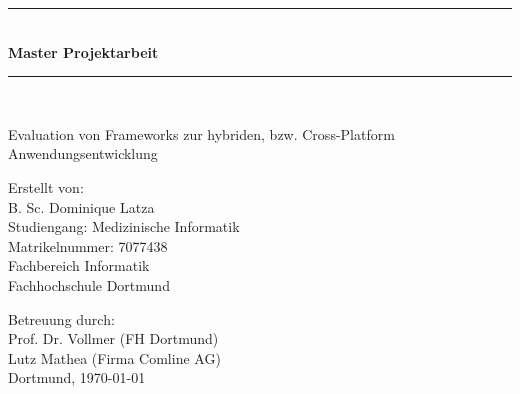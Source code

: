 \newcommand{\HRule}{\rule{\linewidth}					{0.5mm}}

\begin{titlepage}
	\begin{center}

\HRule \\[0.1cm]

\textbf{\large{
Master Projektarbeit
}}

\HRule \\[0.1cm]
\vspace{2.5cm}

\large{}
Evaluation von Frameworks zur hybriden, bzw. Cross-Platform Anwendungsentwicklung
\vspace{2.5cm}

\large{}
Erstellt von:\\
B. Sc. Dominique Latza\\
Studiengang: Medizinische Informatik\\
Matrikelnummer: 7077438\\
Fachbereich Informatik\\
Fachhochschule Dortmund\\
\vspace{1cm}



\vspace{2.5cm}
Betreuung durch:\\
Prof. Dr. Vollmer (FH Dortmund)\\
Lutz Mathea (Firma Comline AG)\\
\vspace{1.3cm}
Dortmund, \today
		
\end{center}
\end{titlepage}